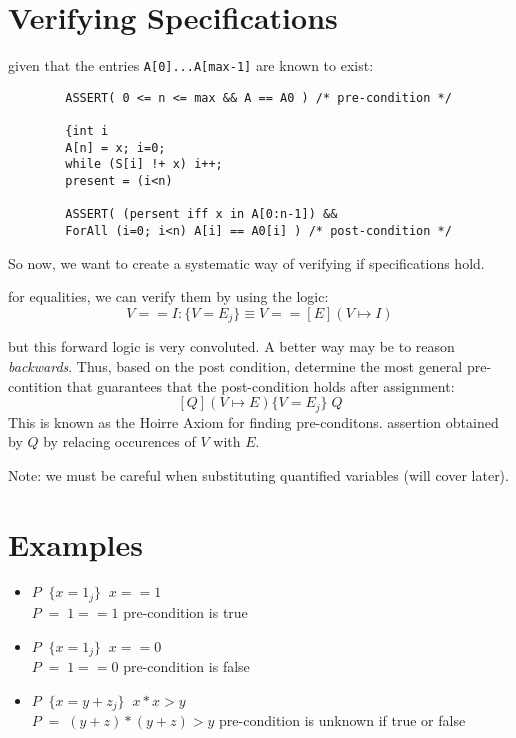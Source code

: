 \documentclass[12pt]{book}
\title{\coursetitle\linebreak\lecturename}
\author{\\Cain Susko\\ 
           \\ \\ \\
      Queen's University 
    \\School of Computing\\}
\begin{document}
\begin{titlepage}
        \maketitle
\end{titlepage}


\section*{Verifying Specifications}
given that the entries \texttt{A[0]...A[max-1]} are known to exist:
\begin{verbatim}
        ASSERT( 0 <= n <= max && A == A0 ) /* pre-condition */

        {int i
        A[n] = x; i=0;
        while (S[i] !+ x) i++;
        present = (i<n)

        ASSERT( (persent iff x in A[0:n-1]) && 
        ForAll (i=0; i<n) A[i] == A0[i] ) /* post-condition */
\end{verbatim}

So now, we want to create a systematic way of verifying if specifications hold.

for equalities, we can verify them by using the logic:
\[V == I :\{V = E_j\}\equiv V==[E](V\mapsto I)\]

but this forward logic is very convoluted. A better way may be to reason \textit{backwards}. Thus, based on the post condition, determine the
most general pre-contition that guarantees that the post-condition holds after assignment:
\[[Q](V \mapsto E) \{V = E_j\}\;Q\]
This is known as the Hoirre Axiom for finding pre-conditons.
assertion obtained by $Q$ by relacing occurences of $V$ with $E$.


Note: we must be careful when substituting quantified variables (will cover later).

\section*{Examples}
\begin{itemize}
        \item $P\;\;\{x = 1_j\}\;\;x==1$\\
                $P\;=\;1==1$ pre-condition is true
        \item $P\;\;\{x = 1_j\}\;\;x==0$\\
                $P\;=\;1==0$ pre-condition is false
        \item $P\;\;\{x = y + z_j\}\;\;x*x>y$\\
                $P\;=\;(y+z)*(y+z)>y$ pre-condition is unknown if true or false
\end{itemize}
\end{document}
